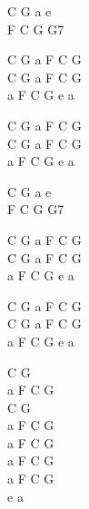 \begin{chord}

    C G a e\\
    F C G G7

    C G a F C G\\
    C G a F C G\\
    a F C G e a

    C G a F C G\\
    C G a F C G\\
    a F C G e a
 
    C G a e\\
    F C G G7

    C G a F C G\\
    C G a F C G\\
    a F C G e a

    C G a F C G\\
    C G a F C G\\
    a F C G e a

    C G\\
    a F C G\\
    C G\\
    a F C G\\
    a F C G\\
    a F C G\\
    a F C G\\
    e a

\end{chord}